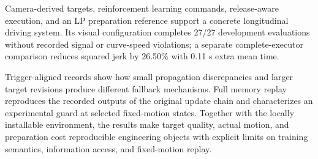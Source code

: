 \documentclass[letterpaper,journal]{IEEEtran}
\begin{document}
Camera-derived targets, reinforcement learning commands, release-aware execution, and an LP preparation reference support a concrete longitudinal driving system. Its visual configuration completes 27/27 development evaluations without recorded signal or curve-speed violations; a separate complete-executor comparison reduces squared jerk by 26.50\% with 0.11 s extra mean time.

Trigger-aligned records show how small propagation discrepancies and larger target revisions produce different fallback mechanisms. Full memory replay reproduces the recorded outputs of the original update chain and characterizes an experimental guard at selected fixed-motion states. Together with the locally installable environment, the results make target quality, actual motion, and preparation cost reproducible engineering objects with explicit limits on training semantics, information access, and fixed-motion replay.
\end{document}
